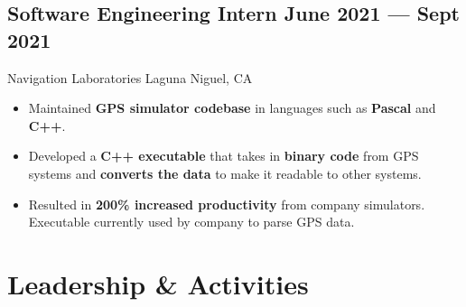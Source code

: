 \documentclass[a4,10pt]{article}
\newcommand{\subtext}[1]{
#1\par\vspace{-0.2cm}}
\newenvironment{zitemize}{
\begin{itemize}\itemsep0pt \parskip0pt \parsep1pt}
{\end{itemize}\vspace{-0.5cm}}
\begin{document}
\subsection*{Software Engineering Intern \hfill June 2021 --- Sept 2021} 
\subtext{Navigation Laboratories \hfill Laguna Niguel, CA}
\vspace{-.1cm}
    \begin{zitemize}
        \item Maintained \textbf{GPS simulator codebase} in languages such as \textbf{Pascal} and \textbf{C++}.
        \item Developed a \textbf{C++ executable} that takes in \textbf{binary code} from GPS systems and \textbf{converts the data} to make it readable to other systems.
        \item Resulted in \textbf{200\% increased productivity} from company simulators. Executable currently used by company to parse GPS data.
    \end{zitemize}

\section{Leadership \& Activities}

        

\end{document}

